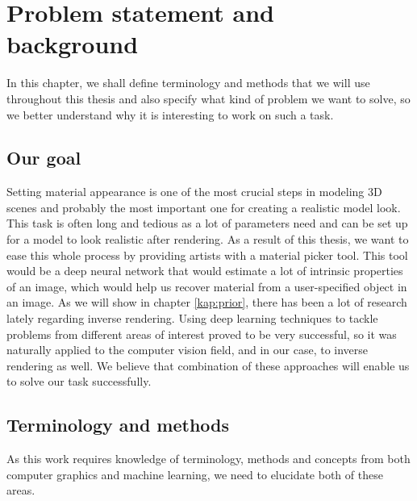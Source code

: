\chapter{Problem statement and background}
\label{kap:problem}

In this chapter, we shall define terminology and methods that we will use throughout this thesis and also specify what kind of problem we want to solve, so we better understand why it is interesting to work on such a task. 

\section{Our goal}
Setting material appearance is one of the most crucial steps in modeling 3D scenes and probably the most important one for creating a realistic model look. This task is often long and tedious as a lot of parameters need and can be set up for a model to look realistic after rendering.
\newline
As a result of this thesis, we want to ease this whole process by providing artists with a material picker tool. This tool would be a deep neural network that would estimate a lot of intrinsic properties of an image, which would help us recover material from a user-specified object in an image.
\newline
As we will show in chapter \ref{kap:prior}, there has been a lot of research lately regarding inverse rendering. Using deep learning techniques to tackle problems from different areas of interest proved to be very successful, so it was naturally applied to the computer vision field, and in our case, to inverse rendering as well. We believe that combination of these approaches will enable us to solve our task successfully.

\section{Terminology and methods}
    As this work requires knowledge of terminology, methods and concepts from both computer graphics and machine learning, we need to elucidate both of these areas.
